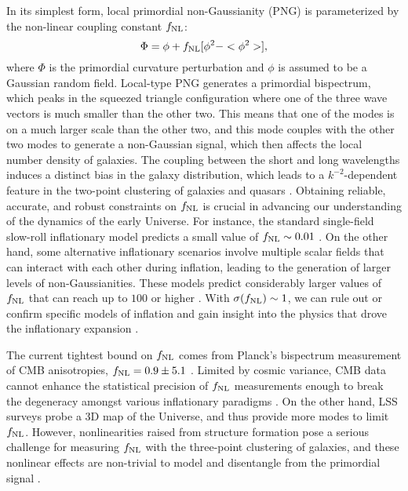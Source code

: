 In its simplest form, local primordial non-Gaussianity (PNG) is parameterized by the non-linear coupling constant $f_{\rm NL}$\citep{komatsu2001acoustic}:
\begin{equation}
 \Phi = \phi + f_{\rm NL} [\phi^{2} - <\phi^{2}>],
\end{equation}
where $\Phi$ is the primordial curvature perturbation and $\phi$ is assumed to be a Gaussian random field. Local-type PNG generates a primordial bispectrum, which peaks in the squeezed triangle configuration where one of the three wave vectors is much smaller than the other two. This means that one of the modes is on a much larger scale than the other two, and this mode couples with the other two modes to generate a non-Gaussian signal, which then affects the local number density of galaxies. The coupling between the short and long wavelengths induces a distinct bias in the galaxy distribution, which leads to a $k^{-2}$-dependent feature in the two-point clustering of galaxies and quasars \citep{dalal2008imprints}. Obtaining reliable, accurate, and robust constraints on $f_{\rm NL}$ is crucial in advancing our understanding of the dynamics of the early Universe. For instance, the standard single-field slow-roll inflationary model predicts a small value of $f_{\rm NL} \sim 0.01$ \citep[see, e.g.,][]{2003JHEP...05..013M}. On the other hand, some alternative inflationary scenarios involve multiple scalar fields that can interact with each other during inflation, leading to the generation of larger levels of non-Gaussianities. These models predict considerably larger values of $f_{\rm NL}$ that can reach up to $100$ or higher \citep[see, e.g.,][]{Byrnes_2008, 2011PhRvD..84b3520P}. With $\sigma (f_{\rm NL})\sim 1$, we can rule out or confirm specific models of inflation and gain insight into the physics that drove the inflationary expansion \citep[see, e.g.,][]{alvarez2014arXiv1412.4671A, de2017next}.

The current tightest bound on $f_{\rm NL}$ comes from Planck's bispectrum measurement of CMB anisotropies, $f_{\rm NL}=0.9\pm 5.1$ \citep{akrami2019planck}. Limited by cosmic variance, CMB data cannot enhance the statistical precision of $f_{\rm NL}$ measurements enough to break the degeneracy amongst various inflationary paradigms \citep[see, e.g.,][]{2016arXiv161002743A, ade2019simons}. On the other hand, LSS surveys probe a 3D map of the Universe, and thus provide more modes to limit $f_{\rm NL}$. However, nonlinearities raised from structure formation pose a serious challenge for measuring $f_{\rm NL}$ with the three-point clustering of galaxies, and these nonlinear effects are non-trivial to model and disentangle from the primordial signal \citep{baldauf2011galaxy, baldauf2011primordial}.

